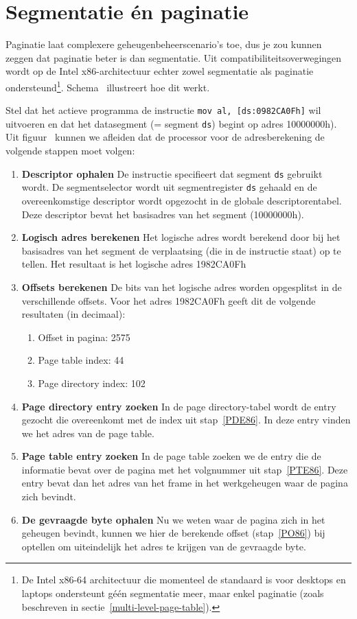 \section{Segmentatie \'en paginatie}

Paginatie laat complexere geheugenbeheerscenario's toe, dus je zou kunnen zeggen dat paginatie beter is dan segmentatie. Uit compatibiliteitsoverwegingen wordt op de Intel x86-architectuur echter zowel segmentatie als paginatie ondersteund\footnote{De Intel x86-64 architectuur die momenteel de standaard is voor desktops en laptops ondersteunt g\'e\'en segmentatie meer, maar enkel paginatie (zoals beschreven in sectie~\ref{multi-level-page-table}).}. Schema~ illustreert hoe dit werkt.


Stel dat het actieve programma de instructie \texttt{mov al, [ds:0982CA0Fh]} wil uitvoeren en dat het datasegment (= segment \texttt{ds}) begint op adres 10000000h). Uit figuur~ kunnen we afleiden dat de processor voor de adresberekening de volgende stappen moet volgen:

\begin{enumerate}
\item{\textbf{Descriptor ophalen}} De instructie specifieert dat segment \texttt{ds} gebruikt wordt. De segmentselector wordt uit segmentregister \texttt{ds} gehaald en de overeenkomstige descriptor wordt opgezocht in de globale descriptorentabel. Deze descriptor bevat het basisadres van het segment (10000000h).
\item{\textbf{Logisch adres berekenen}} Het logische adres wordt berekend door bij het basisadres van het segment de verplaatsing (die in de instructie staat) op te tellen. Het resultaat is het logische adres 1982CA0Fh
\item{\textbf{Offsets berekenen}} De bits van het logische adres worden opgesplitst in de verschillende offsets. Voor het adres 1982CA0Fh geeft dit de volgende resultaten (in decimaal):
    \begin{enumerate}
    \item{Offset in pagina:}\label{PO86} 2575
    \item{Page table index:}\label{PTE86} 44
    \item{Page directory index:}\label{PDE86} 102
    \end{enumerate}
\item{\textbf{Page directory entry zoeken}} In de page directory-tabel wordt de entry gezocht die overeenkomt met de index uit stap~\ref{PDE86}. In deze entry vinden we het adres van de page table.
\item{\textbf{Page table entry zoeken}} In de page table zoeken we de entry die de informatie bevat over de pagina met het volgnummer uit stap~\ref{PTE86}. Deze entry bevat dan het adres van het frame in het werkgeheugen waar de pagina zich bevindt.
\item{\textbf{De gevraagde byte ophalen}} Nu we weten waar de pagina zich in het geheugen bevindt, kunnen we hier de berekende offset (stap~\ref{PO86}) bij optellen om uiteindelijk het adres te krijgen van de gevraagde byte.
\end{enumerate}

